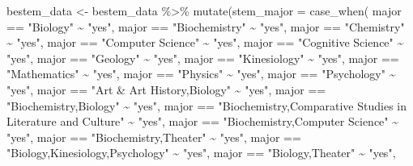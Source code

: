 \documentclass[
]{article}
\newenvironment{Shaded}{\begin{snugshade}}{\end{snugshade}}
\newcommand{\AttributeTok}[1]{\textcolor[rgb]{0.77,0.63,0.00}{#1}}
\newcommand{\FunctionTok}[1]{\textcolor[rgb]{0.00,0.00,0.00}{#1}}
\newcommand{\NormalTok}[1]{#1}
\newcommand{\OtherTok}[1]{\textcolor[rgb]{0.56,0.35,0.01}{#1}}
\newcommand{\SpecialCharTok}[1]{\textcolor[rgb]{0.00,0.00,0.00}{#1}}
\newcommand{\StringTok}[1]{\textcolor[rgb]{0.31,0.60,0.02}{#1}}
\begin{document}
\begin{Shaded}
\begin{Highlighting}[]
         
\NormalTok{bestem\_data }\OtherTok{\textless{}{-}}\NormalTok{ bestem\_data }\SpecialCharTok{\%\textgreater{}\%}
  \FunctionTok{mutate}\NormalTok{(}\AttributeTok{stem\_major =} \FunctionTok{case\_when}\NormalTok{(}
\NormalTok{    major }\SpecialCharTok{==} \StringTok{"Biology"} \SpecialCharTok{\textasciitilde{}} \StringTok{"yes"}\NormalTok{, }
\NormalTok{    major }\SpecialCharTok{==} \StringTok{"Biochemistry"} \SpecialCharTok{\textasciitilde{}} \StringTok{"yes"}\NormalTok{,}
\NormalTok{    major }\SpecialCharTok{==} \StringTok{"Chemistry"} \SpecialCharTok{\textasciitilde{}} \StringTok{"yes"}\NormalTok{,}
\NormalTok{    major }\SpecialCharTok{==} \StringTok{"Computer Science"} \SpecialCharTok{\textasciitilde{}} \StringTok{"yes"}\NormalTok{,}
\NormalTok{    major }\SpecialCharTok{==} \StringTok{"Cognitive Science"} \SpecialCharTok{\textasciitilde{}} \StringTok{"yes"}\NormalTok{,}
\NormalTok{    major }\SpecialCharTok{==} \StringTok{"Geology"} \SpecialCharTok{\textasciitilde{}} \StringTok{"yes"}\NormalTok{,}
\NormalTok{    major }\SpecialCharTok{==} \StringTok{"Kinesiology"} \SpecialCharTok{\textasciitilde{}} \StringTok{"yes"}\NormalTok{,}
\NormalTok{    major }\SpecialCharTok{==} \StringTok{"Mathematics"} \SpecialCharTok{\textasciitilde{}} \StringTok{"yes"}\NormalTok{,}
\NormalTok{    major }\SpecialCharTok{==} \StringTok{"Physics"} \SpecialCharTok{\textasciitilde{}} \StringTok{"yes"}\NormalTok{,}
\NormalTok{    major }\SpecialCharTok{==} \StringTok{"Psychology"} \SpecialCharTok{\textasciitilde{}} \StringTok{"yes"}\NormalTok{,}
\NormalTok{    major }\SpecialCharTok{==} \StringTok{"Art \& Art History,Biology"} \SpecialCharTok{\textasciitilde{}} \StringTok{"yes"}\NormalTok{,}
\NormalTok{    major }\SpecialCharTok{==} \StringTok{"Biochemistry,Biology"} \SpecialCharTok{\textasciitilde{}} \StringTok{"yes"}\NormalTok{,}
\NormalTok{    major }\SpecialCharTok{==} \StringTok{"Biochemistry,Comparative Studies in Literature and Culture"} \SpecialCharTok{\textasciitilde{}} \StringTok{"yes"}\NormalTok{,}
\NormalTok{    major }\SpecialCharTok{==} \StringTok{"Biochemistry,Computer Science"} \SpecialCharTok{\textasciitilde{}} \StringTok{"yes"}\NormalTok{,}
\NormalTok{    major }\SpecialCharTok{==} \StringTok{"Biochemistry,Theater"} \SpecialCharTok{\textasciitilde{}} \StringTok{"yes"}\NormalTok{,}
\NormalTok{    major }\SpecialCharTok{==} \StringTok{"Biology,Kinesiology,Psychology"} \SpecialCharTok{\textasciitilde{}} \StringTok{"yes"}\NormalTok{,}
\NormalTok{    major }\SpecialCharTok{==} \StringTok{"Biology,Theater"} \SpecialCharTok{\textasciitilde{}} \StringTok{"yes"}\NormalTok{,}

\end{Highlighting}
\end{Shaded}
\end{document}
